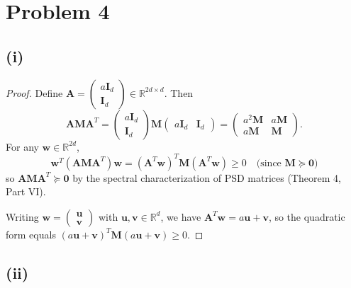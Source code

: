\section*{Problem 4}

\subsection*{(i)}

\begin{proof}
Define $\mathbf{A} = \begin{pmatrix} a\mathbf{I}_d \\ \mathbf{I}_d \end{pmatrix} \in \mathbb{R}^{2d \times d}$. Then
\[
\mathbf{A}\mathbf{M}\mathbf{A}^T = \begin{pmatrix} a\mathbf{I}_d \\ \mathbf{I}_d \end{pmatrix} \mathbf{M} \begin{pmatrix} a\mathbf{I}_d & \mathbf{I}_d \end{pmatrix} = \begin{pmatrix} a^2\mathbf{M} & a\mathbf{M} \\ a\mathbf{M} & \mathbf{M} \end{pmatrix}.
\]
For any $\mathbf{w} \in \mathbb{R}^{2d}$,
\[
\mathbf{w}^T (\mathbf{A}\mathbf{M}\mathbf{A}^T) \mathbf{w} = (\mathbf{A}^T \mathbf{w})^T \mathbf{M} (\mathbf{A}^T \mathbf{w}) \geq 0 \quad \text{(since } \mathbf{M} \succeq \mathbf{0}\text{)}
\]
so $\mathbf{A}\mathbf{M}\mathbf{A}^T \succeq \mathbf{0}$ by the spectral characterization of PSD matrices (Theorem 4, Part VI).

Writing $\mathbf{w} = \begin{pmatrix} \mathbf{u} \\ \mathbf{v} \end{pmatrix}$ with $\mathbf{u}, \mathbf{v} \in \mathbb{R}^d$, we have $\mathbf{A}^T \mathbf{w} = a\mathbf{u} + \mathbf{v}$, so the quadratic form equals $(a\mathbf{u} + \mathbf{v})^T \mathbf{M} (a\mathbf{u} + \mathbf{v}) \geq 0$.
\end{proof}

\subsection*{(ii)}


